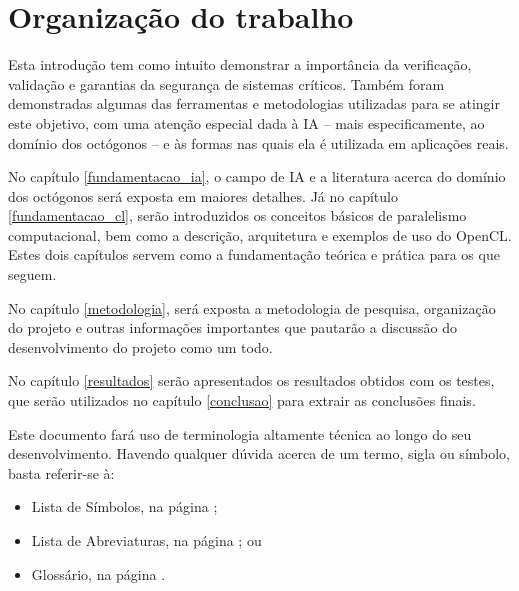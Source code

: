     
    \section{Organização do trabalho}
    
    Esta introdução tem como intuito demonstrar a importância da verificação, 
    validação e garantias da segurança de sistemas críticos. Também foram 
    demonstradas algumas das ferramentas e metodologias utilizadas para se 
    atingir este objetivo, com uma atenção especial dada à \gls{IA} -- mais 
    especificamente, ao domínio dos octógonos -- e às formas nas quais ela é 
    utilizada em aplicações reais.
    
    No capítulo \ref{fundamentacao_ia}, o campo de \gls{IA} e a literatura 
    acerca do domínio dos octógonos será exposta em maiores detalhes. Já no 
    capítulo \ref{fundamentacao_cl}, serão introduzidos os conceitos básicos de 
    paralelismo computacional, bem como a descrição, arquitetura e exemplos de 
    uso do \gls{OpenCL}. Estes dois capítulos servem como a fundamentação 
    teórica e prática para os que seguem.
    
    No capítulo \ref{metodologia}, será exposta a metodologia de pesquisa, 
    organização do projeto e outras informações importantes que pautarão a 
    discussão do desenvolvimento do projeto como um todo.
    
    No capítulo \ref{resultados} serão apresentados os resultados obtidos com 
    os testes, que serão utilizados no capítulo \ref{conclusao} para extrair as 
    conclusões finais.
    
    Este documento fará uso de terminologia altamente técnica ao longo do seu 
    desenvolvimento. Havendo qualquer dúvida acerca de um termo, sigla ou 
    símbolo, basta referir-se à:
    
    \begin{itemize}
        \item Lista de Símbolos, na página \pageref{pre:simbolos};
        \item Lista de Abreviaturas, na página \pageref{pre:abreviaturas}; ou
        \item Glossário, na página \pageref{pos:glossario}.
    \end{itemize} 
